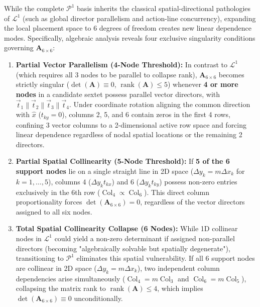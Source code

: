 \documentclass[preprint,12pt]{elsarticle}
\begin{document}
While the complete $\mathcal{P}^1$ basis inherits the classical spatial-directional pathologies of $\mathcal{L}^1$ (such as global director parallelism and action-line concurrency), expanding the local placement space to 6 degrees of freedom creates new linear dependence modes. Specifically, algebraic analysis reveals four exclusive singularity conditions governing $\mathbf{A}_{6 \times 6}$:

\begin{enumerate}
    \item \textbf{Partial Vector Parallelism (4-Node Threshold):} In contrast to $\mathcal{L}^1$ (which requires all 3 nodes to be parallel to collapse rank), $\mathbf{A}_{6 \times 6}$ becomes strictly singular ($\det(\mathbf{A}) \equiv 0$, $\operatorname{rank}(\mathbf{A}) \le 5$) whenever \textbf{4 or more nodes} in a candidate sextet possess parallel vector directors, with $\vec{t}_1 \parallel \vec{t}_2 \parallel \vec{t}_3 \parallel \vec{t}_4$. Under coordinate rotation aligning the common direction with $\hat{x}$ ($t_{ky} = 0$), columns 2, 5, and 6 contain zeros in the first 4 rows, confining 3 vector columns to a 2-dimensional active row space and forcing linear dependence regardless of nodal spatial locations or the remaining 2 directors.

    \item \textbf{Partial Spatial Collinearity (5-Node Threshold):} If \textbf{5 of the 6 support nodes} lie on a single straight line in 2D space ($\Delta y_k = m \Delta x_k$ for $k=1,\dots,5$), columns 4 ($\Delta y_k t_{kx}$) and 6 ($\Delta y_k t_{ky}$) possess non-zero entries exclusively in the 6th row ($\operatorname{Col}_4 \propto \operatorname{Col}_6$). This direct column proportionality forces $\det(\mathbf{A}_{6 \times 6}) = 0$, regardless of the vector directors assigned to all six nodes.

    \item \textbf{Total Spatial Collinearity Collapse (6 Nodes):} While 1D collinear nodes in $\mathcal{L}^1$ could yield a non-zero determinant if assigned non-parallel directors (becoming "algebraically solvable but spatially degenerate"), transitioning to $\mathcal{P}^1$ eliminates this spatial vulnerability. If all 6 support nodes are collinear in 2D space ($\Delta y_k = m \Delta x_k$), two independent column dependencies arise simultaneously ($\operatorname{Col}_4 = m \operatorname{Col}_3$ and $\operatorname{Col}_6 = m \operatorname{Col}_5$), collapsing the matrix rank to $\operatorname{rank}(\mathbf{A}) \le 4$, which implies $\det(\mathbf{A}_{6 \times 6}) \equiv 0$ unconditionally.


\end{enumerate}
\end{document}

